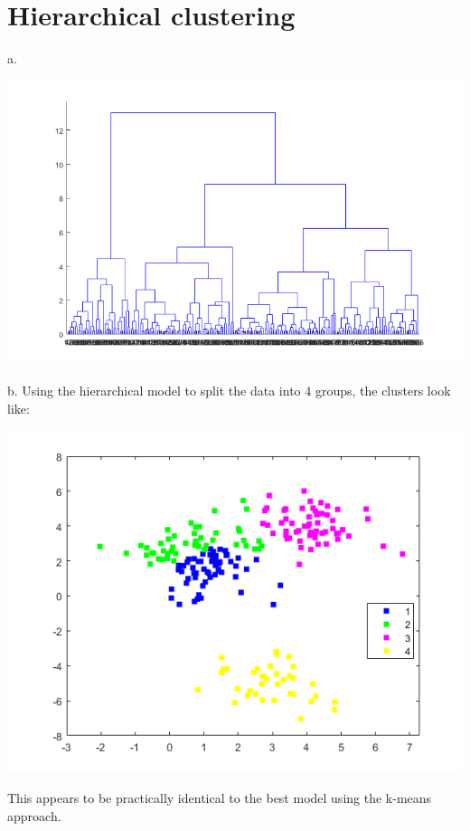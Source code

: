 \documentclass{article}
\begin{document}
\section{Hierarchical clustering}

a.

\begin{center}
    \includegraphics[scale=0.75]{2a.png}
\end{center}

\noindent 
b. Using the hierarchical model to split the data into 4 groups, the clusters look like: 

\begin{center}
    \includegraphics[scale=1]{2b.png}
\end{center}

This appears to be practically identical to the best model using the k-means approach.
\end{document}
